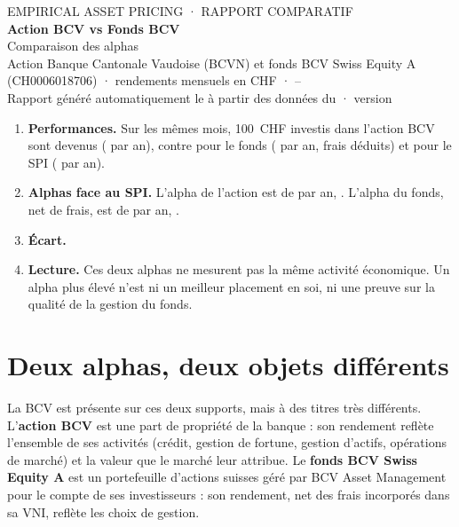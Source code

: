 \documentclass[11pt,a4paper]{article}
\begin{document}
\begin{center}
  {\small\color{gris} EMPIRICAL ASSET PRICING · RAPPORT COMPARATIF}\\[6pt]
  {\LARGE\bfseries Action BCV vs Fonds BCV}\\[4pt]
  {\large Comparaison des alphas}\\[8pt]
  {\small Action Banque Cantonale Vaudoise (BCVN) et fonds BCV Swiss Equity A (CH0006018706) · rendements mensuels en CHF · \PairDebut{} – \PairFin{}}\\[2pt]
  {\small\color{gris} Rapport généré automatiquement le \DateRapport{} à partir des données du \DateDonnees{} · version \texttt{\Commit}}
\end{center}

\vspace{4pt}

\begin{essentiel}
\begin{enumerate}[leftmargin=*,label=\textbf{\arabic*.}]
  \item \textbf{Performances.} Sur les mêmes \PairN{} mois, 100~CHF investis dans l'action BCV sont devenus \ActCroiss{} (\ActRend{} par an), contre \FdsCroiss{} pour le fonds (\FdsRend{} par an, frais déduits) et \SpiCroiss{} pour le SPI (\SpiRend{} par an).
  \item \textbf{Alphas face au SPI.} L'alpha de l'action est de \ActAlphaA{} par an, \ActVerdict. L'alpha du fonds, net de frais, est de \FdsAlphaA{} par an, \FdsVerdict.
  \item \textbf{Écart.} \DiffPhrase
  \item \textbf{Lecture.} Ces deux alphas ne mesurent pas la même activité économique. Un alpha plus élevé n'est ni un meilleur placement en soi, ni une preuve sur la qualité de la gestion du fonds.
\end{enumerate}
\end{essentiel}

\section{Deux alphas, deux objets différents}

La BCV est présente sur ces deux supports, mais à des titres très différents. L'\textbf{action BCV} est une part de propriété de la banque : son rendement reflète l'ensemble de ses activités (crédit, gestion de fortune, gestion d'actifs, opérations de marché) et la valeur que le marché leur attribue. Le \textbf{fonds BCV Swiss Equity A} est un portefeuille d'actions suisses géré par BCV Asset Management pour le compte de ses investisseurs : son rendement, net des frais incorporés dans sa VNI, reflète les choix de gestion.
\end{document}
